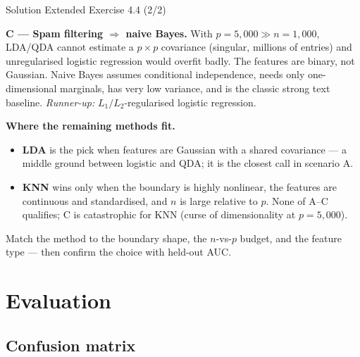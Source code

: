 \documentclass[aspectratio=169,11pt]{beamer}
\begin{document}
\begin{frame}{Solution \textemdash{} Extended Exercise 4.4 (2/2)}
\begin{solutionbox}
\scriptsize
\textbf{C --- Spam filtering $\Rightarrow$ naive Bayes.}
With $p=5{,}000\gg n=1{,}000$, LDA/QDA cannot estimate a $p\times p$
covariance (singular, millions of entries) and unregularised logistic
regression would overfit badly. The features are binary, not Gaussian.
Naive Bayes assumes conditional independence, needs only one-dimensional
marginals, has very low variance, and is the classic strong text
baseline. \emph{Runner-up:} $L_1/L_2$-regularised logistic regression.

\vspace{1mm}
\textbf{Where the remaining methods fit.}
\begin{itemize}
  \item \textbf{LDA} is the pick when features are Gaussian with a shared
        covariance --- a middle ground between logistic and QDA; it is the
        closest call in scenario A.
  \item \textbf{KNN} wins only when the boundary is highly nonlinear,
        the features are continuous and standardised, and $n$ is large
        relative to $p$. None of A--C qualifies; C is catastrophic for
        KNN (curse of dimensionality at $p=5{,}000$).
\end{itemize}
\begin{takeaway}
Match the method to the boundary shape, the $n$-vs-$p$ budget, and the
feature type --- then confirm the choice with held-out AUC.
\end{takeaway}
\end{solutionbox}
\end{frame}

\section{Evaluation}
\subsection{Confusion matrix}
\end{document}
